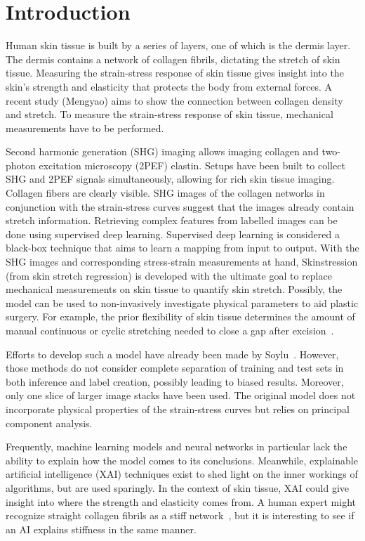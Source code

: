 \section{Introduction}

Human skin tissue is built by a series of layers, one of which is the dermis layer.
The dermis contains a network of collagen fibrils, dictating the stretch of skin tissue.
Measuring the strain-stress response of skin tissue gives insight into the skin's strength and elasticity that protects the body from external forces.
A recent study (Mengyao) aims to show the connection between collagen density and stretch.
To measure the strain-stress response of skin tissue, mechanical measurements have to be performed.

Second harmonic generation (SHG) imaging allows imaging collagen and two-photon excitation microscopy (2PEF) elastin.
Setups have been built to collect SHG and 2PEF signals simultaneously, allowing for rich skin tissue imaging.
Collagen fibers are clearly visible.
SHG images of the collagen networks in conjunction with the strain-stress curves suggest that the images already contain stretch information.
Retrieving complex features from labelled images can be done using supervised deep learning.
Supervised deep learning is considered a black-box technique that aims to learn a mapping from input to output.
With the SHG images and corresponding stress-strain measurements at hand, Skinstression (from skin stretch regression) is developed with the ultimate goal to replace mechanical measurements on skin tissue to quantify skin stretch.
Possibly, the model can be used to non-invasively investigate physical parameters to aid plastic surgery.
For example, the prior flexibility of skin tissue determines the amount of manual continuous or cyclic stretching needed to close a gap after excision~.

Efforts to develop such a model have already been made by Soylu~.
However, those methods do not consider complete separation of training and test sets in both inference and label creation, possibly leading to biased results.
Moreover, only one slice of larger image stacks have been used.
The original model does not incorporate physical properties of the strain-stress curves but relies on principal component analysis.

Frequently, machine learning models and neural networks in particular lack the ability to explain how the model comes to its conclusions.
Meanwhile, explainable artificial intelligence (XAI) techniques exist to shed light on the inner workings of algorithms, but are used sparingly.
In the context of skin tissue, XAI could give insight into where the strength and elasticity comes from.
A human expert might recognize straight collagen fibrils as a stiff network~, but it is interesting to see if an AI explains stiffness in the same manner.

